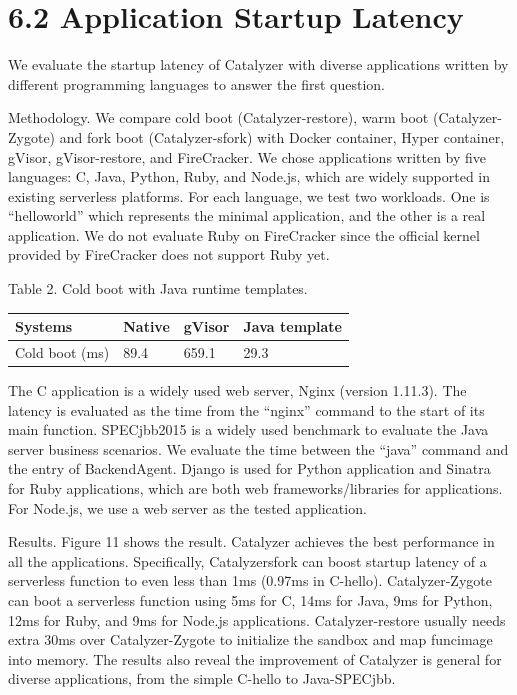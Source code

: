 \documentclass[
  10
]{article}
\newcounter{none} %
\begin{document}
\section{6.2 Application Startup
Latency}\label{application-startup-latency}

We evaluate the startup latency of Catalyzer with diverse applications
written by different programming languages to answer the first question.

Methodology. We compare cold boot (Catalyzer-restore), warm boot
(Catalyzer-Zygote) and fork boot (Catalyzer-sfork) with Docker
container, Hyper container, gVisor, gVisor-restore, and FireCracker. We
chose applications written by five languages: C, Java, Python, Ruby, and
Node.js, which are widely supported in existing serverless platforms.
For each language, we test two workloads. One is ``helloworld'' which
represents the minimal application, and the other is a real application.
We do not evaluate Ruby on FireCracker since the official kernel
provided by FireCracker does not support Ruby yet.

Table 2. Cold boot with Java runtime templates.

{\def\LTcaptype{none} %
\begin{longtable}[]{@{}|l|l|l|l|@{}}
\toprule\noalign{}
\endhead
\bottomrule\noalign{}
\endlastfoot
\hline
Systems & Native & gVisor & Java template \\
\hline
Cold boot (ms) & 89.4 & 659.1 & 29.3 \\
\hline
\end{longtable}
}

The C application is a widely used web server, Nginx (version 1.11.3).
The latency is evaluated as the time from the ``nginx'' command to the
start of its main function. SPECjbb2015 is a widely used benchmark to
evaluate the Java server business scenarios. We evaluate the time
between the ``java'' command and the entry of BackendAgent. Django is
used for Python application and Sinatra for Ruby applications, which are
both web frameworks/libraries for applications. For Node.js, we use a
web server as the tested application.

Results. Figure 11 shows the result. Catalyzer achieves the best
performance in all the applications. Specifically, Catalyzersfork can
boost startup latency of a serverless function to even less than 1ms
(0.97ms in C-hello). Catalyzer-Zygote can boot a serverless function
using 5ms for C, 14ms for Java, 9ms for Python, 12ms for Ruby, and 9ms
for Node.js applications. Catalyzer-restore usually needs extra 30ms
over Catalyzer-Zygote to initialize the sandbox and map funcimage into
memory. The results also reveal the improvement of Catalyzer is general
for diverse applications, from the simple C-hello to Java-SPECjbb.
\end{document}
